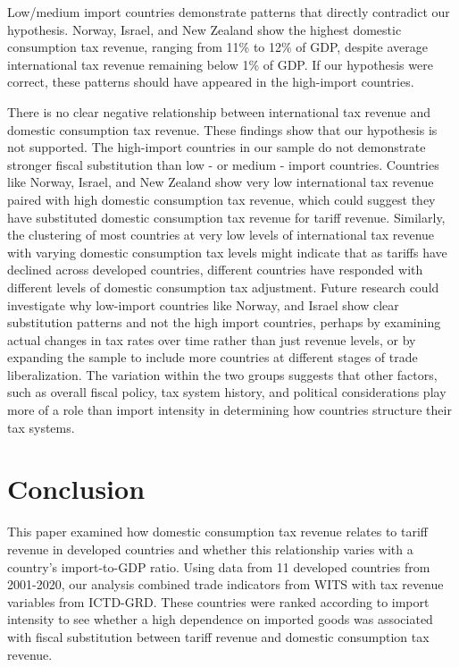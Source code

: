 \documentclass[12pt]{article}
\begin{document}
    Low/medium import countries demonstrate patterns that directly contradict our hypothesis. Norway, Israel, and New Zealand show the highest domestic consumption tax revenue, ranging from 11\% to 12\% of GDP, despite average international tax revenue remaining below 1\% of GDP. If our hypothesis were correct, these patterns should have appeared in the high-import countries. 

    There is no clear negative relationship between international tax revenue and domestic consumption tax revenue. These findings show that our hypothesis is not supported. The high-import countries in our sample do not demonstrate stronger fiscal substitution than low - or medium - import countries. Countries like Norway, Israel, and New Zealand show very low international tax revenue paired with high domestic consumption tax revenue, which could suggest they have substituted domestic consumption tax revenue for tariff revenue. Similarly, the clustering of most countries at very low levels of international tax revenue with varying domestic consumption tax levels might indicate that as tariffs have declined across developed countries, different countries have responded with different levels of domestic consumption tax adjustment. Future research could investigate why low-import countries like Norway, and Israel show clear substitution patterns and not the high import countries, perhaps by examining actual changes in tax rates over time rather than just revenue levels, or by expanding the sample to include more countries at different stages of trade liberalization. The variation within the two groups suggests that other factors, such as overall fiscal policy, tax system history, and political considerations  play more of a role than import intensity in determining how countries structure their tax systems. 


\section{Conclusion}
\label{sec:conclusion}

This paper examined how domestic consumption tax revenue relates to tariff revenue in developed countries and whether this relationship varies with a country's import-to-GDP ratio.  Using data from 11 developed countries from 2001-2020, our analysis combined trade indicators from WITS with tax revenue variables from ICTD-GRD.  These countries were ranked according to import intensity to see whether a high dependence on imported goods was associated with fiscal substitution between tariff revenue and domestic consumption tax revenue.
\end{document}

